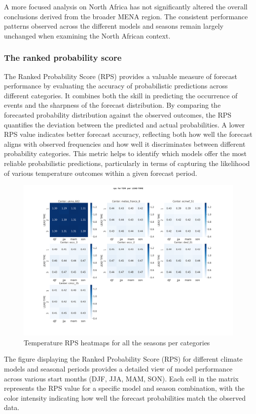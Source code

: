 A more focused analysis on North Africa has not significantly altered the overall conclusions derived from the broader MENA region. The consistent performance patterns observed across the different models and seasons remain largely unchanged when examining the North African context. 




\subsubsection{The ranked probability score }

The Ranked Probability Score (RPS) provides a valuable measure of forecast performance by evaluating the accuracy of probabilistic predictions across different categories. It combines both the skill in predicting the occurrence of events and the sharpness of the forecast distribution. By comparing the forecasted probability distribution against the observed outcomes, the RPS quantifies the deviation between the predicted and actual probabilities. A lower RPS value indicates better forecast accuracy, reflecting both how well the forecast aligns with observed frequencies and how well it discriminates between different probability categories. This metric helps to identify which models offer the most reliable probabilistic predictions, particularly in terms of capturing the likelihood of various temperature outcomes within a given forecast period.
\begin{figure}[H]
    \centering
    \includegraphics[width=1\linewidth]{plots/prob/rps/rps_T2M.png}
    \caption{Temperature RPS  heatmaps for all the seasons per categories}
\end{figure}
The figure displaying the Ranked Probability Score (RPS) for different climate models and seasonal periods provides a detailed view of model performance across various start months (DJF, JJA, MAM, SON). Each cell in the matrix represents the RPS value for a specific model and season combination, with the color intensity indicating how well the forecast probabilities match the observed data.

